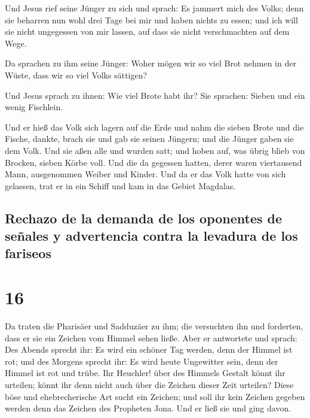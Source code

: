  Und Jesus rief seine Jünger zu sich und sprach: Es
jammert mich des Volks; denn sie beharren nun wohl drei Tage bei mir und
haben nichts zu essen; und ich will sie nicht ungegessen von mir lassen,
auf dass sie nicht verschmachten auf dem Wege.

 Da sprachen zu ihm seine Jünger: Woher mögen wir so viel
Brot nehmen in der Wüste, dass wir so viel Volks sättigen?

 Und Jesus sprach zu ihnen: Wie viel Brote habt ihr? Sie
sprachen: Sieben und ein wenig Fischlein.

 Und er hieß das Volk sich lagern auf die Erde
 und nahm die sieben Brote und die Fische, dankte, brach
sie und gab sie seinen Jüngern; und die Jünger gaben sie dem Volk.
 Und sie aßen alle und wurden satt; und hoben auf, was
übrig blieb von Brocken, sieben Körbe voll.  Und die da
gegessen hatten, derer waren viertausend Mann, ausgenommen Weiber und
Kinder.  Und da er das Volk hatte von sich gelassen, trat
er in ein Schiff und kam in das Gebiet Magdalas.

\hypertarget{rechazo-de-la-demanda-de-los-oponentes-de-seuxf1ales-y-advertencia-contra-la-levadura-de-los-fariseos}{%
\subsection{Rechazo de la demanda de los oponentes de señales y
advertencia contra la levadura de los
fariseos}\label{rechazo-de-la-demanda-de-los-oponentes-de-seuxf1ales-y-advertencia-contra-la-levadura-de-los-fariseos}}

\hypertarget{section-15}{%
\section{16}\label{section-15}}

 Da traten die Pharisäer und Sadduzäer zu ihm; die
versuchten ihn und forderten, dass er sie ein Zeichen vom Himmel sehen
ließe.  Aber er antwortete und sprach: Des Abends sprecht
ihr: Es wird ein schöner Tag werden, denn der Himmel ist rot;
 und des Morgens sprecht ihr: Es wird heute Ungewitter
sein, denn der Himmel ist rot und trübe. Ihr Heuchler! über des Himmels
Gestalt könnt ihr urteilen; könnt ihr denn nicht auch über die Zeichen
dieser Zeit urteilen?  Diese böse und ehebrecherische Art
sucht ein Zeichen; und soll ihr kein Zeichen gegeben werden denn das
Zeichen des Propheten Jona. Und er ließ sie und ging davon.

